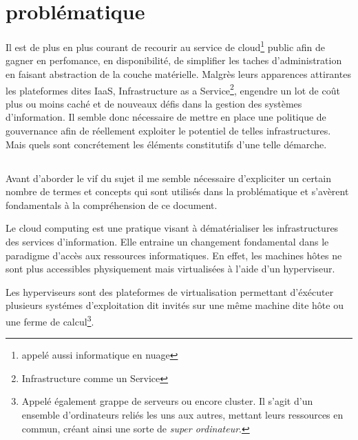 \documentclass[11pt, a4paper ]{report}
\begin{document}
		\section{problématique} %



Il est de plus en plus courant de recourir au service de cloud\footnote{appelé aussi informatique en nuage} public afin de gagner en perfomance, en disponibilité, de simplifier les taches d'administration en faisant abstraction de la couche matérielle.
Malgrès leurs apparences attirantes les plateformes dites IaaS, Infrastructure as a Service\footnote{Infrastructure comme un Service}, engendre un lot de coût plus ou moins caché et de nouveaux défis dans la gestion des systèmes d'information. Il semble donc nécessaire de mettre en place une politique de gouvernance afin de réellement exploiter le potentiel de telles infrastructures.
Mais quels sont concrétement les éléments constitutifs d'une telle démarche.

			\subsection*{}

Avant d'aborder le vif du sujet il me semble nécessaire d'expliciter un certain nombre de termes et concepts qui sont utilisés dans la problématique et s'avèrent fondamentals à la compréhension de ce document.

Le cloud computing\cite{cloudDef} est une pratique visant à dématérialiser les infrastructures des services d'information. Elle entraine un changement fondamental dans le paradigme d'accès aux ressources informatiques. En effet, les machines hôtes ne sont plus accessibles physiquement mais virtualisées à l'aide d'un hyperviseur.

Les hyperviseurs sont des plateformes de virtualisation permettant d'éxécuter plusieurs systémes d'exploitation dit invités sur une même machine dite hôte ou une ferme de calcul\footnote{Appelé également grappe de serveurs ou encore cluster. Il s'agit d'un ensemble d'ordinateurs reliés les uns aux autres, mettant leurs ressources en commun, créant ainsi une sorte de \emph{super ordinateur}. }.
\end{document}
